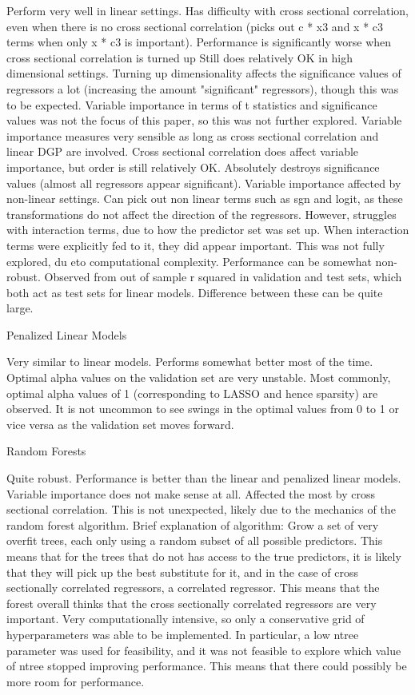 \documentclass[a4paper, table]{article}
\begin{document}
Perform very well in linear settings.
Has difficulty with cross sectional correlation, even when there is no cross sectional correlation (picks out c * x3 and x * c3 terms when only x * c3 is important). Performance is significantly worse when cross sectional correlation is turned up
Still does relatively OK in high dimensional settings. Turning up dimensionality affects the significance values of regressors a lot (increasing the amount "significant" regressors), though this was to be expected. Variable importance in terms of t statistics and significance values was not the focus of this paper, so this was not further explored.
Variable importance measures very sensible as long as cross sectional correlation and linear DGP are involved. Cross sectional correlation does affect variable importance, but order is still relatively OK. Absolutely destroys significance values (almost all regressors appear significant).
Variable importance affected by non-linear settings. Can pick out non linear terms such as sgn and logit, as these transformations do not affect the direction of the regressors. However, struggles with interaction terms, due to how the predictor set was set up. When interaction terms were explicitly fed to it, they did appear important. This was not fully explored, du eto computational complexity.
Performance can be somewhat non-robust. Observed from out of sample r squared in validation and test sets, which both act as test sets for linear models. Difference between these can be quite large.

Penalized Linear Models

Very similar to linear models. Performs somewhat better most of the time. 
Optimal alpha values on the validation set are very unstable. Most commonly, optimal alpha values of 1 (corresponding to LASSO and hence sparsity) are observed. It is not uncommon to see swings in the optimal values from 0 to 1 or vice versa as the validation set moves forward.

Random Forests

Quite robust. Performance is better than the linear and penalized linear models. 
Variable importance does not make sense at all. Affected the most by cross sectional correlation. This is not unexpected, likely due to the mechanics of the random forest algorithm.
Brief explanation of algorithm:
Grow a set of very overfit trees, each only using a random subset of all possible predictors.
This means that for the trees that do not has access to the true predictors, it is likely that they will pick up the best substitute for it, and in the case of cross sectionally correlated regressors, a correlated regressor. This means that the forest overall thinks that the cross sectionally correlated regressors are very important.
Very computationally intensive, so only a conservative grid of hyperparameters was able to be implemented. In particular, a low ntree parameter was used for feasibility, and it was not feasible to explore which value of ntree stopped improving performance. This means that there could possibly be more room for performance.
\end{document}
